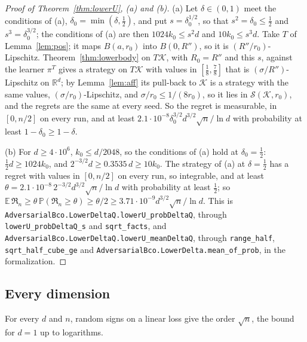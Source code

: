 \documentclass[11pt]{amsart}
\theoremstyle{definition}
\numberwithin{equation}{section}
\newcommand{\R}{\mathbb{R}}
\newcommand{\E}{\mathbb{E}}
\newcommand{\Prob}{\mathbb{P}}
\newcommand{\cK}{\mathcal{K}}
\newcommand{\Reg}{\mathfrak{R}}
\begin{document}
\begin{proof}[Proof of Theorem~\ref{thm:lowerU}, (a) and (b)]
(a) Let $\delta\in(0,1)$ meet the conditions of (a), $\delta_0=\min(\delta,\frac12)$, and put $s=\delta_0^{1/2}$, so that $s^2=\delta_0\le\frac12$ and $s^3=\delta_0^{3/2}$; the conditions of (a) are then $1024k_0\le s^2d$ and $10k_0\le s^3d$. Take $T$ of Lemma~\ref{lem:pos}; it maps $B(a,r_0)$ into $B(0,R'')$, so it is $(R''/r_0)$-Lipschitz. Theorem~\ref{thm:lowerbody} on $T\cK$, with $R_0=R''$ and this $s$, against the learner $\pi^T$ gives a strategy on $T\cK$ with values in $[\frac18,\frac78]$ that is $(\sigma/R'')$-Lipschitz on $\R^d$; by Lemma~\ref{lem:aff} its pull-back to $\cK$ is a strategy with the same values, $(\sigma/r_0)$-Lipschitz, and $\sigma/r_0\le1/(8r_0)$, so it lies in $\mathcal S(\cK,r_0)$, and the regrets are the same at every seed. So the regret is measurable, in $[0,n/2]$ on every run, and at least $2.1\cdot10^{-8}\delta_0^{3/2}d^{3/2}\sqrt n/\ln d$ with probability at least $1-\delta_0\ge1-\delta$.

(b) For $d\ge4\cdot10^6$, $k_0\le d/2048$, so the conditions of (a) hold at $\delta_0=\frac12$: $\frac12d\ge1024k_0$, and $2^{-3/2}d\ge0.3535\,d\ge10k_0$. The strategy of (a) at $\delta=\frac12$ has a regret with values in $[0,n/2]$ on every run, so integrable, and at least $\theta=2.1\cdot10^{-8}\,2^{-3/2}d^{3/2}\sqrt n/\ln d$ with probability at least $\frac12$; so $\E\,\Reg_n\ge\theta\,\Prob(\Reg_n\ge\theta)\ge\theta/2\ge3.71\cdot10^{-9}d^{3/2}\sqrt n/\ln d$.
This is \texttt{AdversarialBco.\allowbreak LowerDeltaQ.\allowbreak lowerU\_probDeltaQ}, through \texttt{lowerU\_probDeltaQ\_s} and \texttt{sqrt\_facts}, and \texttt{AdversarialBco.\allowbreak LowerDeltaQ.\allowbreak lowerU\_meanDeltaQ}, through \texttt{range\_half}, \texttt{sqrt\_half\_cube\_ge} and \texttt{AdversarialBco.\allowbreak LowerDelta.\allowbreak mean\_of\_prob}, in the formalization.
\end{proof}

\subsection{Every dimension}\label{sec:lower-small}

For every $d$ and $n$, random signs on a linear loss give the order $\sqrt n$, the bound for $d=1$ \cite{BDKP15} up to logarithms.
\end{document}
